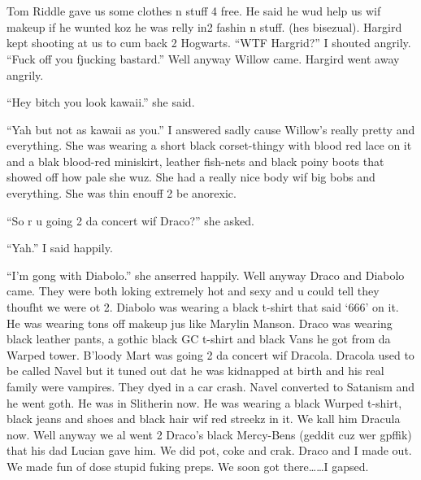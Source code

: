 \section{\chaptername~\thesection}



Tom Riddle gave us some clothes n stuff 4 free. He said he wud help us wif makeup if he wunted koz he was relly in2 fashin n stuff. (hes bisezual). Hargird kept shooting at us to cum back 2 Hogwarts. \enquote{WTF Hargrid?} I shouted angrily. \enquote{Fuck off you fjucking bastard.} Well anyway Willow came. Hargird went away angrily.

\enquote{Hey bitch you look kawaii.} she said.

\enquote{Yah but not as kawaii as you.} I answered sadly cause Willow's really pretty and everything. She was wearing a short black corset-thingy with blood red lace on it and a blak blood-red miniskirt, leather fish-nets and black poiny boots that showed off how pale she wuz. She had a really nice body wif big bobs and everything. She was thin enouff 2 be anorexic.

\enquote{So r u going 2 da concert wif Draco?} she asked.

\enquote{Yah.} I said happily.

\enquote{I'm gong with Diabolo.} she anserred happily. Well anyway Draco and Diabolo came. They were both loking extremely hot and sexy and u could tell they thoufht we were ot 2. Diabolo was wearing a black t-shirt that said \enquote*{666} on it. He was wearing tons off makeup jus like Marylin Manson. Draco was wearing black leather pants, a gothic black GC t-shirt and black Vans he got from da Warped tower. B'loody Mart was going 2 da concert wif Dracola. Dracola used to be called Navel but it tuned out dat he was kidnapped at birth and his real family were vampires. They dyed in a car crash. Navel converted to Satanism and he went goth. He was in Slitherin now. He was wearing a black Wurped t-shirt, black jeans and shoes and black hair wif red streekz in it. We kall him Dracula now. Well anyway we al went 2 Draco's black Mercy-Bens (geddit cuz wer gpffik) that his dad Lucian gave him. We did pot, coke and crak. Draco and I made out. We made fun of dose stupid fuking preps. We soon got there\ldots\ldots I gapsed.

